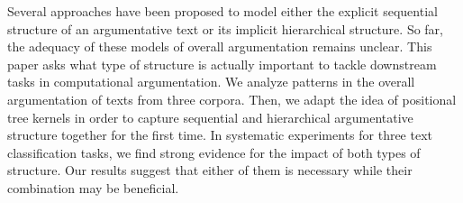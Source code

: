 Several approaches have been proposed to model either the explicit sequential structure of an argumentative text or its implicit hierarchical structure. So far, the adequacy of these models of overall argumentation remains unclear. This paper asks what type of structure is actually important to tackle downstream tasks in computational argumentation. We analyze patterns in the overall argumentation of texts from three corpora. Then, we adapt the idea of positional tree kernels in order to capture sequential and hierarchical argumentative structure together for the first time. In systematic experiments for three text classification tasks, we find strong evidence for the impact of both types of structure. Our results suggest that either of them is necessary while their combination may be beneficial.

